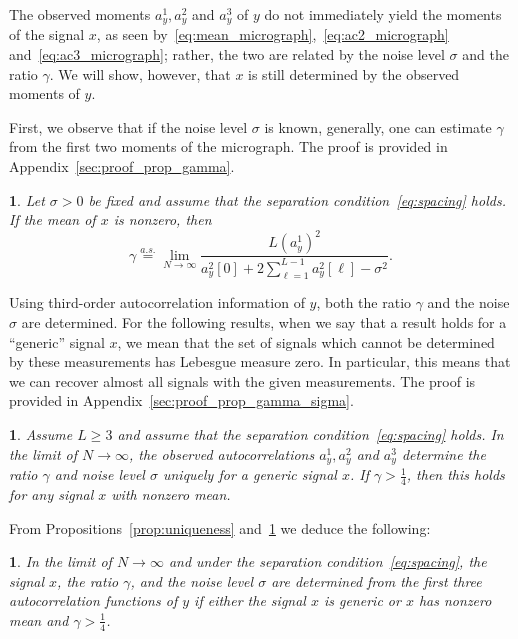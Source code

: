 \documentclass[12pt]{article}
\newcommand{\1}{\mathbf{1}}
\newcommand{\aseq}{\stackrel{a.s.}{=}}
\theoremstyle{plain}
\theoremstyle{definition}
\theoremstyle{remark}
\theoremstyle{plain}
\theoremstyle{remark}
\theoremstyle{plain}
\newtheorem{corollary}[thm]{\protect\corollaryname}
\theoremstyle{plain}
\newtheorem{proposition}[thm]{\protect\propositionname}
\providecommand{\corollaryname}{Corollary}
\providecommand{\propositionname}{Proposition}
\begin{document}
The observed moments $a_y^1,a_y^2$ and $a_y^3$ of $y$ do not immediately yield the moments of the signal $x$, as seen by~\eqref{eq:mean_micrograph},~\eqref{eq:ac2_micrograph} and~\eqref{eq:ac3_micrograph}; rather, the two are related by the noise level $\sigma$ and the ratio $\gamma$. We will show, however, that $x$ is still determined by the observed moments of $y$.

First, we observe that if the noise level $\sigma$ is known, generally, one can estimate $\gamma$ from the first two moments of the micrograph. The proof is provided in Appendix~\ref{sec:proof_prop_gamma}.

\begin{proposition} \label{prop:gamma}
	Let $\sigma > 0$ be fixed and assume that the separation condition~\eqref{eq:spacing} holds. If the mean of $x$ is nonzero, then 
	\begin{equation}
	\gamma  \aseq \lim_{N \to \infty}\frac{L (a^1_y)^2}{a_y^2[0] + 2\sum_{\ell = 1}^{L-1}a_y^2[\ell]-\sigma^2}.
	\end{equation}
\end{proposition}

Using third-order autocorrelation information of $y$, both the ratio $\gamma$ and the noise $\sigma$ are determined. For the following results, when we say that a result holds for a ``generic'' signal $x$, we mean that the set of signals which cannot be determined by these measurements
has Lebesgue measure zero. 
In particular, this means that we can recover
almost all signals with the given measurements. The proof is provided in Appendix~\ref{sec:proof_prop_gamma_sigma}.

\begin{proposition} \label{prop:gamma_sigma}
	Assume $L \geq 3$ and assume that the separation condition~\eqref{eq:spacing} holds. 
	In the limit of $N\to \infty$, the observed autocorrelations $a_y^1,a_y^2$ and  $a_y^3$ determine the ratio $\gamma$ and noise level $\sigma$ uniquely for a generic signal $x$. If $\gamma > \frac{1}{4}$, then this holds for any signal $x$ with nonzero mean. 
\end{proposition}

From Propositions~\ref{prop:uniqueness} and~\ref{prop:gamma_sigma} we   deduce the following:
\begin{corollary}
	In the limit of $N\to \infty$ and under the separation condition~\eqref{eq:spacing}, the signal $x$, the ratio $\gamma$, and the noise level $\sigma$ are determined from the first three autocorrelation functions of $y$ if either the signal $x$ is generic or $x$ has nonzero mean  and $\gamma > \frac{1}{4}$.
\end{corollary}
\end{document}
